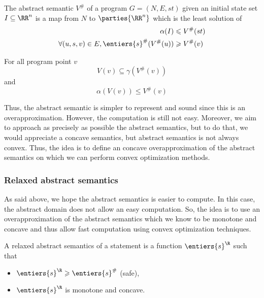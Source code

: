 \documentclass[a4paper, twoside, 10pt]{article}
\begin{document}
\begin{definition}
The abstract semantic $V^\#$ of a program $G=(N,E,st)$ given an initial state set $I \subseteq\RR^n$ is a map from $N$ to $\parties{\RR^n}$ which is the least solution of
\[
    \begin{aligned}
        \alpha(I) &\leqslant V^\#(st)\\
        \forall (u,s,v) \in E, \entiers{s}^\#(V^\#(u)) &\geqslant V^\#(v)
    \end{aligned}
\]
\end{definition}

\begin{lemma}
    For all program point $v$
    \[
        V(v) \subseteq \gamma(V^\#(v))    
    \]
    and
    \[
        \alpha(V(v)) \leqslant V^\#(v)
    \]
\end{lemma}

Thus, the abstract semantic is simpler to represent and sound since this is an overapproximation. However, the computation is still not easy. Moreover, we aim to approach as precisely as possible the abstract semantics, but to do that, we would appreciate a concave semantics, but abstract semantics is not always convex. Thus, the idea is to define an concave overapproximation of the abstract semantics on which we can perform convex optimization methods.

\subsubsection{Relaxed abstract semantics}

As said above, we hope the abstract semantics is easier to compute. In this case, the abstract domain does not allow an easy computation. So, the idea is to use an overapproximation of the abstract semantics which we know to be monotone and concave and thus allow fast computation using convex optimization techniques.

\begin{definition}
    A relaxed abstract semantics of a statement is a function $\entiers{s}^\R$ such that
    \begin{itemize}
        \item $\entiers{s}^\R \geqslant \entiers{s}^\#$ (safe),
        \item $\entiers{s}^\R$ is monotone and concave.
    \end{itemize}
\end{definition}
\end{document}
